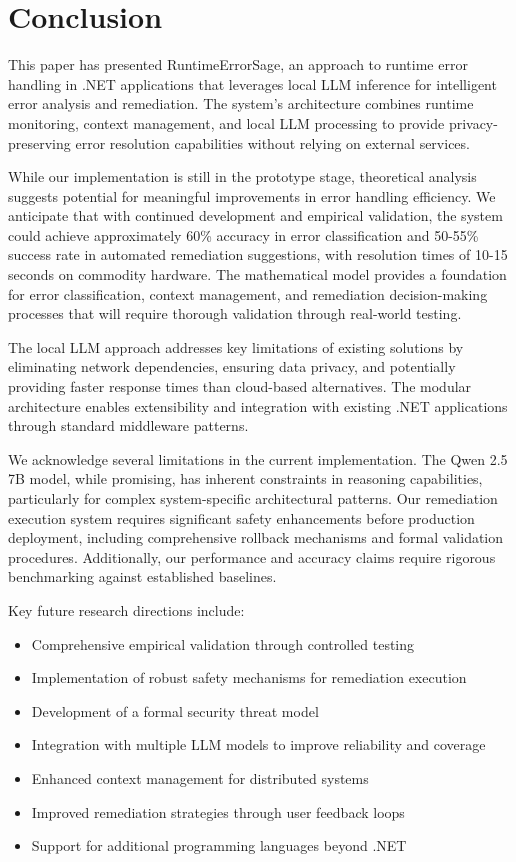 \section{Conclusion}\label{sec:conclusion}
This paper has presented RuntimeErrorSage, an approach to runtime error handling in .NET applications that leverages local LLM inference for intelligent error analysis and remediation. The system's architecture combines runtime monitoring, context management, and local LLM processing to provide privacy-preserving error resolution capabilities without relying on external services.

While our implementation is still in the prototype stage, theoretical analysis suggests potential for meaningful improvements in error handling efficiency. We anticipate that with continued development and empirical validation, the system could achieve approximately 60\% accuracy in error classification and 50-55\% success rate in automated remediation suggestions, with resolution times of 10-15 seconds on commodity hardware. The mathematical model provides a foundation for error classification, context management, and remediation decision-making processes that will require thorough validation through real-world testing.

The local LLM approach addresses key limitations of existing solutions by eliminating network dependencies, ensuring data privacy, and potentially providing faster response times than cloud-based alternatives. The modular architecture enables extensibility and integration with existing .NET applications through standard middleware patterns.

We acknowledge several limitations in the current implementation. The Qwen 2.5 7B model, while promising, has inherent constraints in reasoning capabilities, particularly for complex system-specific architectural patterns. Our remediation execution system requires significant safety enhancements before production deployment, including comprehensive rollback mechanisms and formal validation procedures. Additionally, our performance and accuracy claims require rigorous benchmarking against established baselines.

Key future research directions include:
\begin{itemize}
    \item Comprehensive empirical validation through controlled testing
    \item Implementation of robust safety mechanisms for remediation execution
    \item Development of a formal security threat model
    \item Integration with multiple LLM models to improve reliability and coverage
    \item Enhanced context management for distributed systems
    \item Improved remediation strategies through user feedback loops
    \item Support for additional programming languages beyond .NET
\end{itemize}

